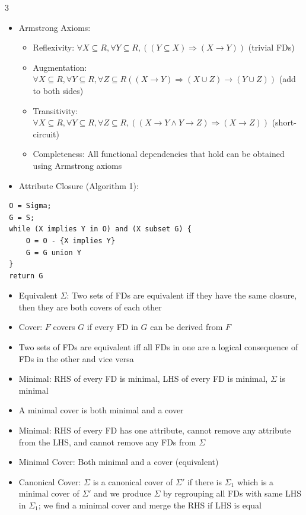 \documentclass[10pt, landscape]{article}
\begin{document}
\begin{multicols*}{3}
\begin{itemize}
    \item Armstrong Axioms:
    \begin{itemize}
        \item Reflexivity: $\forall X \subseteq R, \forall Y \subseteq R, ((Y \subseteq X) \Rightarrow (X \rightarrow Y))$ (trivial FDs)
        \item Augmentation: $\forall X \subseteq R, \forall Y \subseteq R, \forall Z \subseteq R ((X \rightarrow Y) \Rightarrow (X \cup Z) \rightarrow (Y \cup Z))$ (add to both sides)
        \item Transitivity: $\forall X \subseteq R, \forall Y \subseteq R, \forall Z \subseteq R, ((X \rightarrow Y \land Y \rightarrow Z) \Rightarrow (X \rightarrow Z))$ (short-circuit)
        \item Completeness: All functional dependencies that hold can be obtained using Armstrong axioms
    \end{itemize}
    \item Attribute Closure (Algorithm 1):
\end{itemize}
\begin{verbatim}
 O = Sigma;
 G = S;
 while (X implies Y in O) and (X subset G) {
     O = O - {X implies Y}
     G = G union Y
 }
 return G
\end{verbatim}
\begin{itemize}
    \item Equivalent $\Sigma$: Two sets of FDs are equivalent iff they have the same closure, then they are both covers of each other
    \item Cover: $F$ covers $G$ if every FD in $G$ can be derived from $F$
    \item Two sets of FDs are equivalent iff all FDs in one are a logical consequence of FDs in the other and vice versa
    \item Minimal: RHS of every FD is minimal, LHS of every FD is minimal, $\Sigma$ is minimal
    \item A minimal cover is both minimal and a cover
    \item Minimal: RHS of every FD has one attribute, cannot remove any attribute from the LHS, and cannot remove any FDs from $\Sigma$
    \item Minimal Cover: Both minimal and a cover (equivalent)
    \item Canonical Cover: $\Sigma$ is a canonical cover of $\Sigma'$ if there is $\Sigma_1$ which is a minimal cover of $\Sigma'$ and we produce $\Sigma$ by regrouping all FDs with same LHS in $\Sigma_1$; we find a minimal cover and merge the RHS if LHS is equal

\end{itemize}
\end{multicols*}
\end{document}
